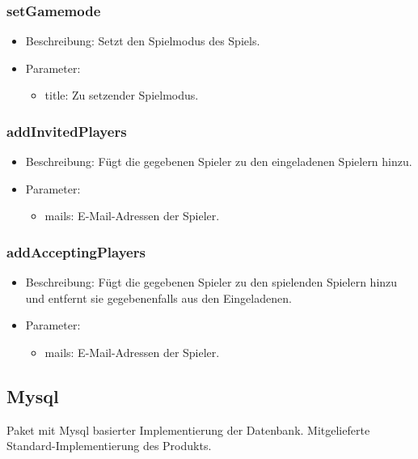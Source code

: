 \documentclass[a4paper]{scrreprt}
\begin{document}
	\subsubsection{setGamemode}
    \begin{itemize}
        \item Beschreibung: Setzt den Spielmodus des Spiels.
        \item Parameter:
        \begin{itemize}
            \item title: Zu setzender Spielmodus.
        \end{itemize}
    \end{itemize}

	\subsubsection{addInvitedPlayers}
    \begin{itemize}
        \item Beschreibung: Fügt die gegebenen Spieler zu den eingeladenen Spielern hinzu.
        \item Parameter:
        \begin{itemize}
			\item mails: E-Mail-Adressen der Spieler.
        \end{itemize}
    \end{itemize}

	\subsubsection{addAcceptingPlayers}
	\begin{itemize}
		\item Beschreibung: Fügt die gegebenen Spieler zu den spielenden Spielern hinzu und entfernt sie gegebenenfalls aus den Eingeladenen.
		\item Parameter:
		\begin{itemize}
			\item mails: E-Mail-Adressen der Spieler.
		\end{itemize}
	\end{itemize}

	\subsection{Mysql}
	Paket mit Mysql basierter Implementierung der Datenbank.
	Mitgelieferte Standard-Implementierung des Produkts.
\end{document}

